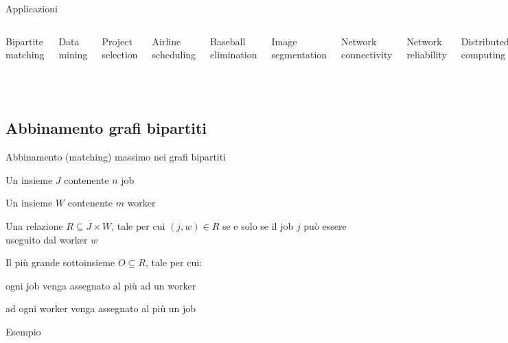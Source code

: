 \begin{frame}{Applicazioni}

\begin{columns}[T]
\BIL
\item Bipartite matching
\item Data mining
\item Project selection
\item Airline scheduling
\item Baseball elimination
\item Image segmentation
\item Network connectivity
\EIL
{}
\BIL
\item Network reliability
\item Distributed computing
\item Egalitarian stable matching
\item Security of statistical data
\item Network intrusion detection
\item Multi-camera scene reconstruction
\item Gene function prediction
\EIL
\end{columns}

\end{frame}

\subsection{Abbinamento grafi bipartiti}

\begin{frame}{Abbinamento (matching) massimo nei grafi bipartiti}

\vspace{-9pt}
\BIL
\item Un insieme $J$ contenente $n$ job
\item Un insieme $W$ contenente $m$ worker
\item Una relazione $R \subseteq J \times W$, tale per cui $(j,w) \in R$
se e solo se il job $j$ può essere useguito dal worker $w$
\EIL

\BIL
\item Il più grande sottoinsieme $O \subseteq R$, tale per cui:
  \BI
  \item ogni job venga assegnato al più ad un worker
  \item ad ogni worker venga assegnato al più un job
  \EI
\EIL

\end{frame}
  
\begin{frame}{Esempio}
  
  
\end{frame}
    


